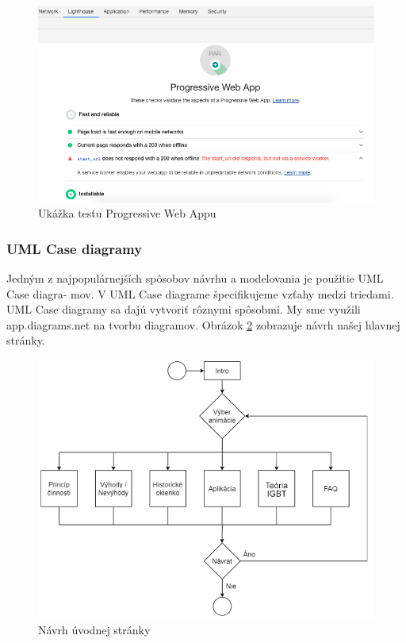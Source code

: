 \begin{figure}[!htbp]
    \centering
    \includegraphics[width=12cm]{img/PWA.png}
    \caption{Ukážka testu Progressive Web Appu  \cite{c30}}
    \label{pwa}
\end{figure}

\subsubsection{UML Case diagramy}
Jedným z najpopulárnejších spôsobov návrhu a modelovania je použitie UML Case diagra- mov. V UML Case diagrame špecifikujeme vzťahy medzi triedami. UML Case diagramy sa dajú vytvoriť rôznymi spôsobmi. My sme využili app.diagrams.net na tvorbu diagramov. Obrázok \ref{UMLMain} zobrazuje návrh našej hlavnej stránky. 

\begin{figure}[!htbp]
    \centering
    \includegraphics[width=12cm]{img/UMLMain.png}
    \caption{Návrh úvodnej stránky}
    \label{UMLMain}
\end{figure}

